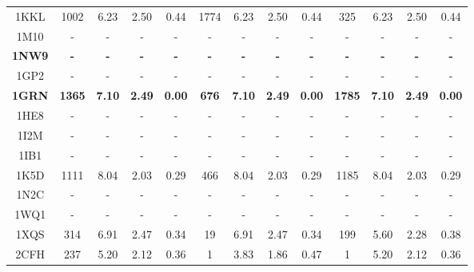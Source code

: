 \begin{longtable}{c c c c c|c c c c|c c c c}
 {\tiny 1KKL} &{\tiny 1002}&{\tiny 6.23}&{\tiny 2.50}&{\tiny 0.44} &{\tiny 1774}&{\tiny 6.23}&{\tiny 2.50}&{\tiny 0.44} &{\tiny 325}&{\tiny 6.23}&{\tiny 2.50}&{\tiny 0.44}\\ 
 {\tiny 1M10} &{\tiny -}&{\tiny -}&{\tiny -}&{\tiny -} &{\tiny -}&{\tiny -}&{\tiny -}&{\tiny -} &{\tiny -}&{\tiny -}&{\tiny -}&{\tiny -}\\ 
 \textbf{\tiny 1NW9} &\textbf{\tiny -}&\textbf{\tiny -}&\textbf{\tiny -}&\textbf{\tiny -} &\textbf{\tiny -}&\textbf{\tiny -}&\textbf{\tiny -}&\textbf{\tiny -} &\textbf{\tiny -}&\textbf{\tiny -}&\textbf{\tiny -}&\textbf{\tiny -}\\ 
 {\tiny 1GP2} &{\tiny -}&{\tiny -}&{\tiny -}&{\tiny -} &{\tiny -}&{\tiny -}&{\tiny -}&{\tiny -} &{\tiny -}&{\tiny -}&{\tiny -}&{\tiny -}\\ 
 \textbf{\tiny 1GRN} &\textbf{\tiny 1365}&\textbf{\tiny 7.10}&\textbf{\tiny 2.49}&\textbf{\tiny 0.00} &\textbf{\tiny 676}&\textbf{\tiny 7.10}&\textbf{\tiny 2.49}&\textbf{\tiny 0.00} &\textbf{\tiny 1785}&\textbf{\tiny 7.10}&\textbf{\tiny 2.49}&\textbf{\tiny 0.00}\\ 
 {\tiny 1HE8} &{\tiny -}&{\tiny -}&{\tiny -}&{\tiny -} &{\tiny -}&{\tiny -}&{\tiny -}&{\tiny -} &{\tiny -}&{\tiny -}&{\tiny -}&{\tiny -}\\ 
 {\tiny 1I2M} &{\tiny -}&{\tiny -}&{\tiny -}&{\tiny -} &{\tiny -}&{\tiny -}&{\tiny -}&{\tiny -} &{\tiny -}&{\tiny -}&{\tiny -}&{\tiny -}\\ 
 {\tiny 1IB1} &{\tiny -}&{\tiny -}&{\tiny -}&{\tiny -} &{\tiny -}&{\tiny -}&{\tiny -}&{\tiny -} &{\tiny -}&{\tiny -}&{\tiny -}&{\tiny -}\\ 
 {\tiny 1K5D} &{\tiny 1111}&{\tiny 8.04}&{\tiny 2.03}&{\tiny 0.29} &{\tiny 466}&{\tiny 8.04}&{\tiny 2.03}&{\tiny 0.29} &{\tiny 1185}&{\tiny 8.04}&{\tiny 2.03}&{\tiny 0.29}\\ 
 {\tiny 1N2C} &{\tiny -}&{\tiny -}&{\tiny -}&{\tiny -} &{\tiny -}&{\tiny -}&{\tiny -}&{\tiny -} &{\tiny -}&{\tiny -}&{\tiny -}&{\tiny -}\\ 
 {\tiny 1WQ1} &{\tiny -}&{\tiny -}&{\tiny -}&{\tiny -} &{\tiny -}&{\tiny -}&{\tiny -}&{\tiny -} &{\tiny -}&{\tiny -}&{\tiny -}&{\tiny -}\\ 
 {\tiny 1XQS} &{\tiny 314}&{\tiny 6.91}&{\tiny 2.47}&{\tiny 0.34} &{\tiny 19}&{\tiny 6.91}&{\tiny 2.47}&{\tiny 0.34} &{\tiny 199}&{\tiny 5.60}&{\tiny 2.28}&{\tiny 0.38}\\ 
 {\tiny 2CFH} &{\tiny 237}&{\tiny 5.20}&{\tiny 2.12}&{\tiny 0.36} &{\tiny 1}&{\tiny 3.83}&{\tiny 1.86}&{\tiny 0.47} &{\tiny 1}&{\tiny 5.20}&{\tiny 2.12}&{\tiny 0.36}\\ 

\end{longtable}
